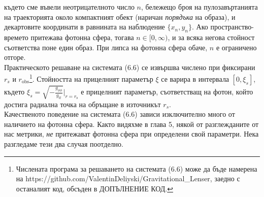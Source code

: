 където сме въвели неотрицателното число $n$, бележещо броя на пулозавъртанията на траекторията около компактният обект (наричан \emph{порядъка} на образа), и декартовите координати в равнината на наблюдение $\{x_n,y_n\}$. Ако пространство-времето притежава фотонна сфера, тогава $n \in [0,\infty)$, и за всяка негова стойност съответства поне един образ. При липса на фотонна сфера обаче, $n$ е ограничено отгоре.\\ 

Практическото решаване на системата (6.6) се извършва числено при фиксирани $r_s$ и $r_\text{obs}$\footnote{ Числената програма за решаването на системата (6.6) може да бъде намерена на https://github.com/ValentinDeliyski/Gravitational\_Lenser, заедно с останалият код, обсъден в ДОПЪЛНЕНИЕ КОД.}. Стойността на прицелният параметър $\xi$ се варира в интервала $\left[0, \xi_s\right]$, където $\xi_s = \sqrt{-\frac{g_{\phi\phi}}{g_{tt}}}\big\vert_{r = r_\text{s}}$ е прицелният параметър, съответстващ на фотон, който достига радиална точка на обръщане в източникът $r_s$.\\

Качественото поведение на системата (6.6) зависи изключително много от наличието на фотонна сфера. Както видяхме в глава 5, някой от разглежданите от нас метрики, \emph{не} притежават фотонна сфера при определени свой параметри. Нека разгледаме тези два случая поотделно.

